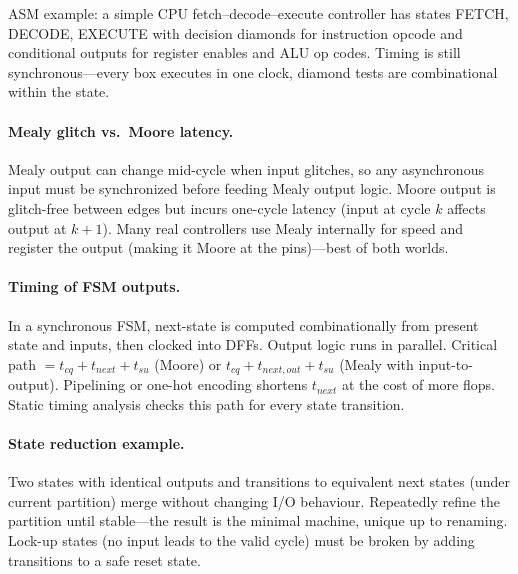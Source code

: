 ASM example: a simple CPU fetch--decode--execute controller has states FETCH, DECODE, EXECUTE with decision diamonds for
instruction opcode and conditional outputs for register enables and ALU op codes. Timing is still synchronous---every box
executes in one clock, diamond tests are combinational within the state.


\paragraph{Mealy glitch vs.\ Moore latency.} Mealy output can change mid-cycle when input glitches, so any
asynchronous input must be synchronized before feeding Mealy output logic. Moore output is glitch-free between edges
but incurs one-cycle latency (input at cycle $k$ affects output at $k+1$). Many real controllers use Mealy internally
for speed and register the output (making it Moore at the pins)---best of both worlds.

\paragraph{Timing of FSM outputs.} In a synchronous FSM, next-state is computed combinationally from present state and inputs,
then clocked into DFFs. Output logic runs in parallel. Critical path $=t_{cq}+t_{next}+t_{su}$ (Moore) or
$t_{cq}+t_{next,out}+t_{su}$ (Mealy with input-to-output). Pipelining or one-hot encoding shortens $t_{next}$ at the cost of more flops.
Static timing analysis checks this path for every state transition.

\paragraph{State reduction example.} Two states with identical outputs and transitions to equivalent next states (under current partition)
merge without changing I/O behaviour. Repeatedly refine the partition until stable---the result is the minimal machine, unique up to renaming.
Lock-up states (no input leads to the valid cycle) must be broken by adding transitions to a safe reset state.

